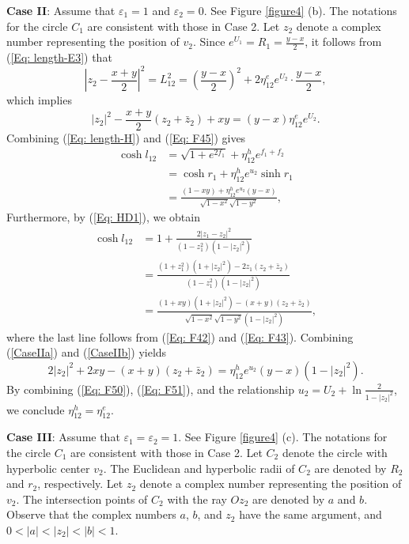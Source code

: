\documentclass[12pt]{amsart}
\theoremstyle{definition}
\begin{document}
\textbf{Case II}:
Assume that $\varepsilon_1=1$ and $\varepsilon_2=0$.
See Figure \ref{figure4} (b).
The notations for the circle $C_1$ are consistent with those in Case 2.
Let $z_2$ denote a complex number representing the position of $v_2$.
Since $e^{U_1}=R_1=\frac{y-x}{2}$, it follows from (\ref{Eq: length-E3}) that
\begin{equation*}
\left|z_2-\frac{x+y}{2}\right|^2=L_{12}^2
=\left(\frac{y-x}{2}\right)^2+2\eta_{12}^ee^{U_2}\cdot \frac{y-x}{2},
\end{equation*}
which implies
\begin{equation}\label{Eq: F50}
|z_2|^2-\frac{x+y}{2}(z_2+\bar{z}_2)+xy
=(y-x)\eta_{12}^ee^{U_2}.
\end{equation}
Combining (\ref{Eq: length-H}) and (\ref{Eq: F45}) gives
\begin{equation}\label{CaseIIa}
\begin{aligned}
\cosh l_{12}
&=\sqrt{1+e^{2f_1}}+\eta_{12}^he^{f_1+f_2}\\
&=\cosh r_1+\eta_{12}^he^{u_2}\sinh r_1\\
&=\frac{(1-xy)+\eta^h_{12}e^{u_2}(y-x)}{\sqrt{1-x^2}\sqrt{1-y^2}},
\end{aligned}
\end{equation}
Furthermore, by (\ref{Eq: HD1}), we obtain
\begin{equation}\label{CaseIIb}
\begin{aligned}
\cosh l_{12}
&=1+\frac{2|z_1-z_2|^2}{(1-z_1^2)(1-|z_2|^2)}\\
&=\frac{(1+z_1^2)(1+|z_2|^2)-2z_1(z_2+\bar{z}_2)}{(1-z_1^2)(1-|z_2|^2)}\\
&=\frac{(1+xy)(1+|z_2|^2)-(x+y)(z_2+\bar{z}_2)}{\sqrt{1-x^2}\sqrt{1-y^2}(1-|z_2|^2)},
\end{aligned}
\end{equation}
where the last line follows from (\ref{Eq: F42}) and (\ref{Eq: F43}).
Combining (\ref{CaseIIa}) and (\ref{CaseIIb}) yields
\begin{equation}\label{Eq: F51}
2|z_2|^2+2xy-(x+y)(z_2+\bar{z}_2)
=\eta^h_{12}e^{u_2}(y-x)(1-|z_2|^2).
\end{equation}
By combining (\ref{Eq: F50}), (\ref{Eq: F51}), and the relationship $u_2=U_2+\ln\frac{2}{1-|z_2|^2}$, we conclude $\eta_{12}^h=\eta_{12}^e$.

\textbf{Case III}:
Assume that $\varepsilon_1=\varepsilon_2=1$.
See Figure \ref{figure4} (c).
The notations for the circle $C_1$ are consistent with those in Case 2.
Let $C_2$ denote the circle with hyperbolic center $v_2$.
The Euclidean and hyperbolic radii of $C_2$ are denoted by $R_2$ and $r_2$, respectively.
Let $z_2$ denote a complex number representing the position of $v_2$.
The intersection points of $C_2$ with the ray $Oz_2$ are denoted by $a$ and $b$.
Observe that the complex numbers $a$, $b$, and $z_2$ have the same argument, and $0<|a|<|z_2|<|b|<1$.
\end{document}
